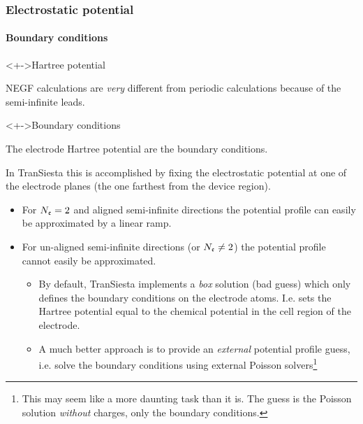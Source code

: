 \begin{frame}
{\begin{center}

  \end{center}}

\end{frame}


\begin{frame}
  \frametitle{Electrostatic potential}
  \framesubtitle{Boundary conditions}

  \begin{block}<+->{Hartree potential}

    NEGF calculations are \emph{very} different from periodic calculations because of the
    semi-infinite leads.

  \end{block}

  \begin{block}<+->{Boundary conditions}

    The electrode Hartree potential are the boundary conditions.

    In TranSiesta this is accomplished by fixing the electrostatic potential at one of the
    electrode planes (the one farthest from the device region).

    \begin{itemize}
      \item For $N_{\mathfrak{e}}=2$ and aligned semi-infinite directions the potential profile can
      easily be approximated by a linear ramp.

      \item For un-aligned semi-infinite directions (or $N_{\mathfrak{e}}\neq2$) the potential
      profile cannot easily be approximated.

      \begin{itemize}[<+->]
        \item By default, TranSiesta implements a \emph{box} solution (bad guess) which
        only defines the boundary conditions on the electrode atoms. I.e. sets the Hartree
        potential equal to the chemical potential in the cell region of the electrode.

        \item A much better approach is to provide an \emph{external} potential profile
        guess, i.e. solve the boundary conditions using external Poisson
        solvers\footnote{This may seem like a more daunting task than it is. The guess is
            the Poisson solution \emph{without} charges, only the boundary conditions.}


\end{itemize}
\end{itemize}
\end{block}
\end{frame}
